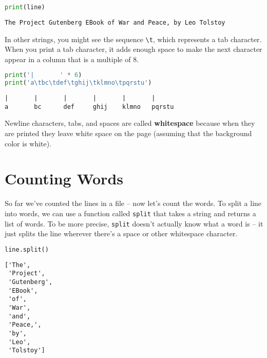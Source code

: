 \begin{lstlisting}[language=Python,style=source]
print(line)
\end{lstlisting}

\begin{lstlisting}[style=output]
The Project Gutenberg EBook of War and Peace, by Leo Tolstoy

\end{lstlisting}

In other strings, you might see the sequence
\passthrough{\lstinline!\\t!}, which represents a tab character. When
you print a tab character, it adds enough space to make the next
character appear in a column that is a multiple of 8.

\begin{lstlisting}[language=Python,style=source]
print('|       ' * 6)
print('a\tbc\tdef\tghij\tklmno\tpqrstu')
\end{lstlisting}

\begin{lstlisting}[style=output]
|       |       |       |       |       |
a       bc      def     ghij    klmno   pqrstu
\end{lstlisting}

Newline characters, tabs, and spaces are called \textbf{whitespace}
because when they are printed they leave white space on the page
(assuming that the background color is white).

\section{Counting Words}\label{counting-words}

So far we've counted the lines in a file -- now let's count the words.
To split a line into words, we can use a function called
\passthrough{\lstinline!split!} that takes a string and returns a list
of words. To be more precise, \passthrough{\lstinline!split!} doesn't
actually know what a word is -- it just splits the line wherever there's
a space or other whitespace character.

\begin{lstlisting}[language=Python,style=source]
line.split()
\end{lstlisting}

\begin{lstlisting}[style=output]
['The',
 'Project',
 'Gutenberg',
 'EBook',
 'of',
 'War',
 'and',
 'Peace,',
 'by',
 'Leo',
 'Tolstoy']
\end{lstlisting}

